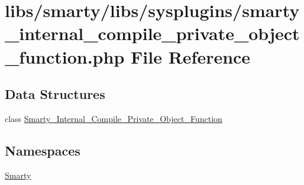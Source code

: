 \hypertarget{smarty__internal__compile__private__object__function_8php}{}\section{libs/smarty/libs/sysplugins/smarty\+\_\+internal\+\_\+compile\+\_\+private\+\_\+object\+\_\+function.php File Reference}
\label{smarty__internal__compile__private__object__function_8php}
\subsection*{Data Structures}
\begin{DoxyCompactItemize}
\item 
class \hyperlink{class_smarty___internal___compile___private___object___function}{Smarty\+\_\+\+Internal\+\_\+\+Compile\+\_\+\+Private\+\_\+\+Object\+\_\+\+Function}
\end{DoxyCompactItemize}
\subsection*{Namespaces}
\begin{DoxyCompactItemize}
\item 
 \hyperlink{namespace_smarty}{Smarty}
\end{DoxyCompactItemize}
